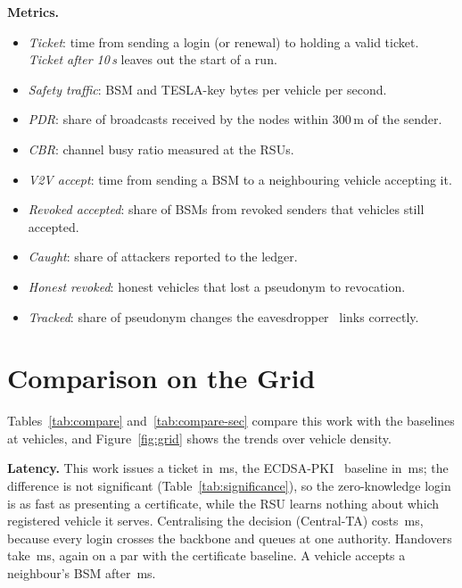 \textbf{Metrics.}
\begin{itemize}
  \item \emph{Ticket}: time from sending a login (or renewal) to holding a valid ticket. \emph{Ticket
  after 10\,s} leaves out the start of a run.
  \item \emph{Safety traffic}: BSM and TESLA-key bytes per vehicle per second.
  \item \emph{PDR}: share of broadcasts received by the nodes within 300\,m of the sender.
  \item \emph{CBR}: channel busy ratio measured at the RSUs.
  \item \emph{V2V accept}: time from sending a BSM to a neighbouring vehicle accepting it.
  \item \emph{Revoked accepted}: share of BSMs from revoked senders that vehicles still accepted.
  \item \emph{Caught}: share of attackers reported to the ledger.
  \item \emph{Honest revoked}: honest vehicles that lost a pseudonym to revocation.
  \item \emph{Tracked}: share of pseudonym changes the eavesdropper~\cite{gruteser2005tracking} links correctly.
\end{itemize}

\section{Comparison on the Grid}\label{sec:res-grid}


Tables~\ref{tab:compare} and~\ref{tab:compare-sec} compare this work with the baselines at
 vehicles, and Figure~\ref{fig:grid} shows the trends over vehicle density.

\textbf{Latency.} This work issues a ticket in \,ms, the ECDSA-PKI~\cite{johnson2001ecdsa}
baseline in \,ms; the difference is not significant
(Table~\ref{tab:significance}), so the zero-knowledge login is as fast as presenting a certificate,
while the RSU learns nothing about which registered vehicle it serves. Centralising the decision
(Central-TA) costs \,ms, because every login crosses the backbone
and queues at one authority. Handovers take \,ms, again on a par
with the certificate baseline. A vehicle accepts a neighbour's BSM after
\,ms.

